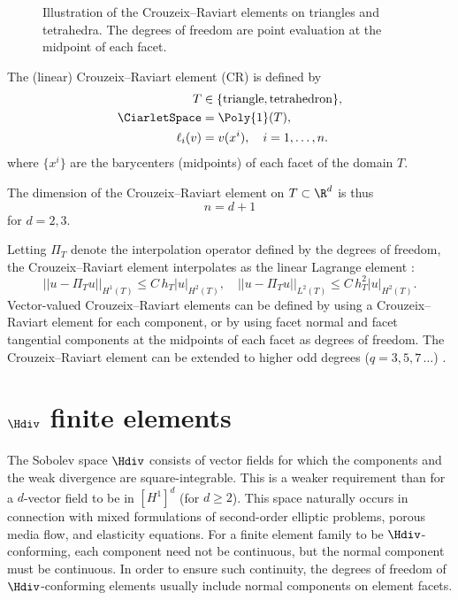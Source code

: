 \begin{figure}
  \caption{Illustration of the Crouzeix--Raviart elements on
    triangles and tetrahedra. The degrees of freedom are point
    evaluation at the midpoint of each facet.}
  \label{kirby-6:fig:cr:tri}
\end{figure}

\begin{definition}
  The (linear) Crouzeix--Raviart element ($\mathrm{CR}$) is defined by
  \begin{align}
    T &\in \{ \mathrm{triangle}{}, \mathrm{tetrahedron}{}\}, \\
    \CiarletSpace &= \Poly{1}(T), \\
    \ell_i(v) &= v(x^i), \quad i = 1, \dots, n.
  \end{align}
  where $\{x^i\}$ are the barycenters (midpoints) of each facet of the
  domain $T$.
\end{definition}
The dimension of the Crouzeix--Raviart element on $T \subset \R^d$ is
thus
\begin{equation}
  n = d + 1
\end{equation}
for $d = 2, 3$.


Letting $\Pi_T$ denote the interpolation operator defined by the
degrees of freedom, the Crouzeix--Raviart element interpolates as the
linear Lagrange element \citep[Chapter 3.I]{Braess2007}:
\begin{equation}
  ||u - \Pi_T u||_{H^1(T)} \leqslant C \, h_T |u|_{H^2(T)}, \quad
  ||u - \Pi_T u||_{L^2(T)} \leqslant C \, h_T^{2} |u|_{H^2(T)}.
\end{equation}
Vector-valued Crouzeix--Raviart elements can be defined by using a
Crouzeix--Raviart element for each component, or by using facet normal
and facet tangential components at the midpoints of each facet as
degrees of freedom. The Crouzeix--Raviart element can be extended to
higher odd degrees ($q=3,5,7\,\ldots$) \citep{CrouzeixFalk1989}.

\section{$\Hdiv$ finite elements}

The Sobolev space $\Hdiv$ consists of vector fields for which the
components and the weak divergence are square-integrable. This is a
weaker requirement than for a $d$-vector field to be in $[H^1]^d$ (for
$d \geqslant 2$). This space naturally occurs in connection with mixed
formulations of second-order elliptic problems, porous media flow, and
elasticity equations. For a finite element family to be
$\Hdiv$-conforming, each component need not be continuous, but the
normal component must be continuous. In order to ensure such
continuity, the degrees of freedom of $\Hdiv$-conforming elements
usually include normal components on element facets.

